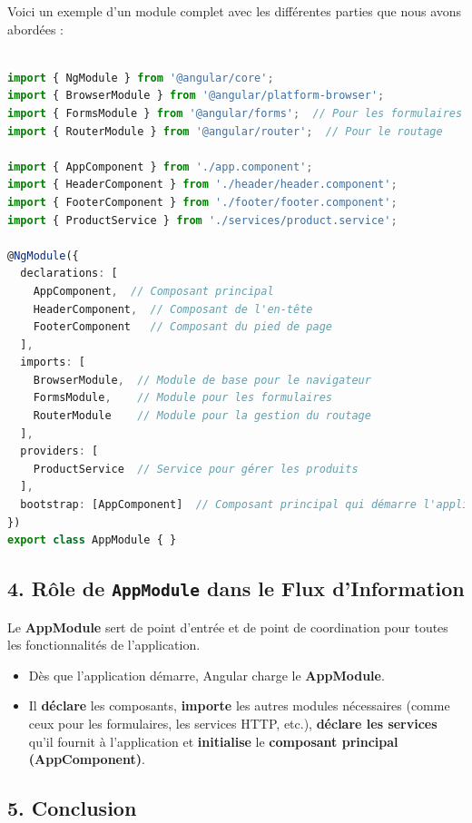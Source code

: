 \documentclass{article}
\begin{document}
Voici un exemple d'un module complet avec les différentes parties que nous avons abordées :

\begin{lstlisting}[language=TypeScript, caption={Using a service in a component}, label={lst:typescript-service-usage}]

import { NgModule } from '@angular/core';
import { BrowserModule } from '@angular/platform-browser';
import { FormsModule } from '@angular/forms';  // Pour les formulaires
import { RouterModule } from '@angular/router';  // Pour le routage

import { AppComponent } from './app.component';
import { HeaderComponent } from './header/header.component';
import { FooterComponent } from './footer/footer.component';
import { ProductService } from './services/product.service';

@NgModule({
  declarations: [
    AppComponent,  // Composant principal
    HeaderComponent,  // Composant de l'en-tête
    FooterComponent   // Composant du pied de page
  ],
  imports: [
    BrowserModule,  // Module de base pour le navigateur
    FormsModule,    // Module pour les formulaires
    RouterModule    // Module pour la gestion du routage
  ],
  providers: [
    ProductService  // Service pour gérer les produits
  ],
  bootstrap: [AppComponent]  // Composant principal qui démarre l'application
})
export class AppModule { }
\end{lstlisting}

\subsection*{4. Rôle de \texttt{AppModule} dans le Flux d'Information}

Le \textbf{AppModule} sert de point d’entrée et de point de coordination pour toutes les fonctionnalités de l’application.  
\begin{itemize}
    \item Dès que l'application démarre, Angular charge le \textbf{AppModule}.
    \item Il \textbf{déclare} les composants, \textbf{importe} les autres modules nécessaires (comme ceux pour les formulaires, les services HTTP, etc.), \textbf{déclare les services} qu’il fournit à l’application et \textbf{initialise} le \textbf{composant principal (AppComponent)}.
\end{itemize}

\subsection*{5. Conclusion}
\end{document}
